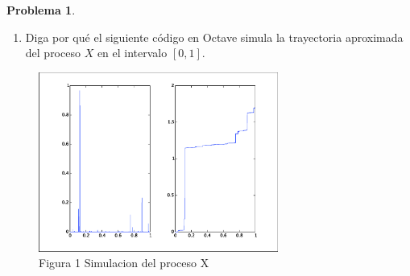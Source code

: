 \documentclass[a5paper,oneside]{amsart}
\theoremstyle{plain}
\theoremstyle{definition}
\newtheorem{problema}{Problema}
\begin{document}
\begin{problema}
\begin{enumerate}
\begin{proof}
$$ $$
 Recordando que la funci\'on Gamma;
 $$
 \Gamma(z+1)=\int_0^{\infty}t^ze^{-t}dt=\int_0^{\infty}(\lambda y)^ze{-\lambda y}\lambda\,dy
 $$
 Entonces:
 $$
 \frac{Ct\lambda^{\alpha}}{\alpha}\int_0^{\infty}  e^{-\lambda y}(\lambda y)^{-\alpha} \lambda \,dy= \frac{Ct\lambda^{\alpha}}{\alpha}\Gamma(1-\alpha)
 $$
 Por lo tanto:
\begin{equation}
   \esp{e^{-\lambda X_t}}=\exp\paren{-\frac{C\lambda^{\alpha}\Gamma(1-\alpha)t}{\alpha}}
\end{equation}
 Lo anterior nos esta dando la expresi\'on para  la funci\'on generadora de momentos de $X_t$ evaluada en $-\lambda$, entonces para verificar que $X_t$ tiene la misma distribuci\'on    que $t^{1/\alpha}X_1$  tenemos que ver que $   \esp{e^{-\lambda t^{1/\alpha}X_1}}= \esp{e^{-\lambda X_t}}$ para toda $\lambda$. Consideremos entonces la funci\'on $\phi(\lambda;t):=\esp{e^{-\lambda X_t}}=\exp\paren{-\frac{C\lambda^{\alpha}\Gamma(1-\alpha)t}{\alpha}}$. Como  lo anterior fue calculado para $t>0$ arbitrario entonces tomando $t=1$ obtenemos que:
 $$
 \phi(\lambda;1):=\esp{e^{-\lambda X_1}}=\exp\paren{-\frac{C\lambda^{\alpha}\Gamma(1-\alpha)(1)}{\alpha}}
 $$
Luego, evaluando la funci\'on en $\lambda t^{1/\alpha}$ obtenemos:
$$
 \phi(\lambda t^{1/\alpha} ;1):=\esp{e^{-\lambda t^{1/\alpha} X_1}}=\exp\paren{-\frac{C(\lambda t^{1/\alpha} )^{\alpha}\Gamma(1-\alpha)(1)}{\alpha}}
$$
Entonces:
$$
\esp{e^{-\lambda t^{1/\alpha} X_1}}=\exp\paren{-\frac{C\lambda^{\alpha}\Gamma(1-\alpha)t}{\alpha}}=   \esp{e^{-\lambda X_t}}
$$
 De donde se concluimos que  $X_t$ tiene la misma distribuci\'on    que $t^{1/\alpha}X_1$
  \end{proof}
 \item Diga por qu\'e el siguiente c\'odigo en Octave simula la trayectoria aproximada del proceso $X$ en el intervalo $[0,1]$.

 \end{enumerate}
 \begin{figure}
  \centering
    \includegraphics[width=0.7\textwidth]{Figure1.eps}
  \caption{Figura 1 Simulacion del proceso X}
  \label{fig:ejemplo}
\end{figure}

\end{problema}
\end{document}
